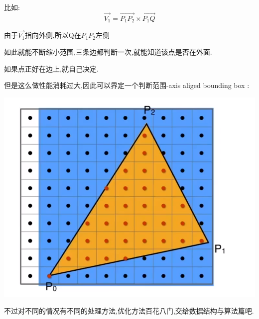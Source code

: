 {{{      比如:
      $$
        \vec{V_1} = \vec{P_1P_2} \times \vec{P_1Q}
      $$

      由于$\vec{V_1}$指向外侧,所以Q在$P_1P_2$左侧

      如此就能不断缩小范围,三条边都判断一次,就能知道该点是否在外面.

      如果点正好在边上,就自己决定.

      但是这么做性能消耗过大,因此可以界定一个判断范围-axis aliged bounding box :

      \begin{center}
        \includegraphics[scale = 0.5]{resources/pixel_boundingBox.png}
      \end{center}

      不过对不同的情况有不同的处理方法,优化方法百花八门,交给数据结构与算法篇吧.
    }%

  }%

 }%
